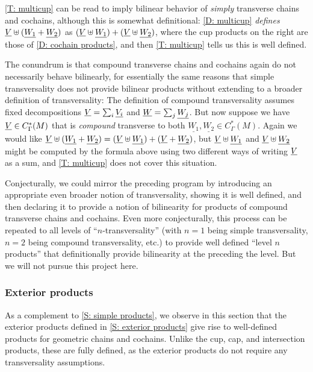 \cref{T: multicup} can be read to imply bilinear behavior of \textit{simply} transverse chains and cochains, although this is somewhat definitional: \cref{D: multicup} \textit{defines} $\underline{V} \uplus (\underline{W_1} + \underline{W_2})$ as  $(\underline{V} \uplus \underline{W_1}) + (\underline{V} \uplus \underline{W_2})$, where the cup products on the right are those of \cref{D: cochain products}, and then \cref{T: multicup} tells us this is well defined.

The conundrum is that compound transverse chains and cochains again do not necessarily behave bilinearly, for essentially the same reasons that simple transversality does not provide bilinear products without extending to a broader definition of transversality:
The definition of compound transversality assumes fixed decompositions $\underline{V} = \sum_i \underline{V_i}$ and $\underline{W} = \sum_j \underline{W_j}$.
But now suppose we have $\underline{V} \in C_\Gamma^*(M)$ that is \textit{compound} transverse to both $\underline{W_1}, \underline{W_2} \in C_\Gamma^*(M)$.
Again we would like $\underline{V} \uplus (\underline{W_1} + \underline{W_2})  = (\underline{V} \uplus \underline{W_1}) + (\underline{V} + \underline{W_2})$, but $\underline{V} \uplus \underline{W_1}$ and $\underline{V} \uplus \underline{W_2}$ might be computed by the formula above using two different ways of writing $\underline{V}$ as a sum, and \cref{T: multicup} does not cover this situation.

Conjecturally, we could mirror the preceding program by introducing an appropriate even broader notion of transversality, showing it is well defined, and then declaring it to provide a notion of bilinearity for products of compound transverse chains and cochains.
Even more conjecturally, this process can be repeated to all levels of ``$n$-transversality'' (with $n=1$ being simple transversality, $n=2$ being compound transversality, etc.) to provide well defined ``level $n$ products'' that definitionally provide bilinearity at the preceding the level.
But we will not pursue this project here.

\subsubsection{Exterior products}\label{S: exterior chain products}

As a complement to \cref{S: simple products}, we observe in this section that the exterior products defined in \cref{S: exterior products} give rise to well-defined products for geometric chains and cochains.
Unlike the cup, cap, and intersection products, these are fully defined, as the exterior products do not require any transversality assumptions.

